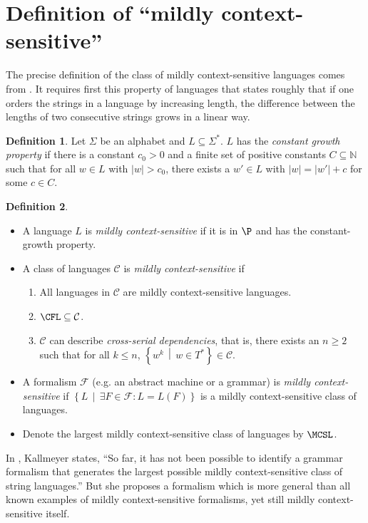 \documentclass[draft]{article}
\theoremstyle{remark} \newtheorem{technicality}{Technical note}
\theoremstyle{definition} \newtheorem{definition}{Definition}
\newcommand{\lb}{\left\{} %
\newcommand{\rb}{\right\}} %
\newcommand{\st}{\,\middle|\,} %
\begin{document}



\appendix
\section{Definition of ``mildly context-sensitive''}
\label{app:definitions}

The precise definition of the class of mildly context-sensitive languages comes from \cite{kallmeyer}.
It requires first this property of languages that states roughly that if one orders the strings in a language by increasing length, the difference between the lengths of two consecutive strings grows in a linear way.
\begin{definition}
  Let $\Sigma$ be an alphabet and $L\subseteq\Sigma^*$.
  $L$ has the \emph{constant growth property} if there is a constant $c_0>0$ and a finite set of positive constants $C\subseteq\mathbb{N}$ such that for all $w\in L$ with $|w|>c_0$, there exists a $w'\in L$ with $|w|=|w'|+c$ for some $c\in C$.
\end{definition}
\begin{definition}\mbox{}
  \begin{itemize}
  \item A language $L$ is \emph{mildly context-sensitive} if it is in $\P$ and has the constant-growth property.
  \item A class of languages $\mathcal{C}$ is \emph{mildly context-sensitive} if
    \begin{enumerate}
    \item All languages in $\mathcal{C}$ are mildly context-sensitive languages.
    \item $\CFL\subseteq\mathcal{C}$.
    \item $\mathcal{C}$ can describe \emph{cross-serial dependencies}, that is, there exists an $n\geq 2$ such that for all $k\leq n$, $\lb w^k \st w\in T^*\rb\in\mathcal{C}$.
    \end{enumerate}
  \item A formalism $\mathcal{F}$ (e.g. an abstract machine or a grammar) is \emph{mildly context-sensitive} if $\lb L \st \exists F\in\mathcal{F}\colon L = L(F)\rb$ is a mildly context-sensitive class of languages.
  \item Denote the largest mildly context-sensitive class of languages by $\MCSL$.
  \end{itemize}
\end{definition}

In \cite{kallmeyer}, Kallmeyer states, ``So far, it has not been possible to identify a grammar formalism that generates the largest possible mildly context-sensitive class of string languages.''
But she proposes a formalism which is more general than all known examples of mildly context-sensitive formalisms, yet still mildly context-sensitive itself.
\end{document}
